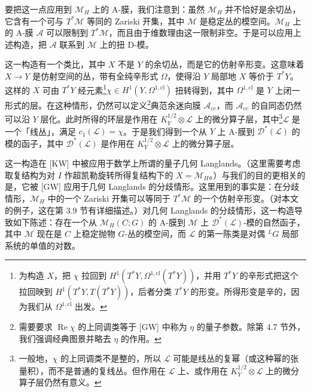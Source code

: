 \documentclass[11pt,a4paper]{article}
\begin{document}
要把这一点应用到 $\mathcal{M}_H$ 上的 A-膜，我们注意到：虽然 $\mathcal{M}_H$ 并不恰好是余切丛，它含有一个可与 $T^*\mathcal{M}$ 等同的 Zariski 开集，其中 $\mathcal{M}$ 是稳定丛的模空间。$\mathcal{M}_H$ 上的 A-膜 $\mathcal{A}$ 可以限制到 $T^*\mathcal{M}$，而且由于维数理由这一限制非空。于是可以应用上述构造，把 $\mathcal{A}$ 联系到 $\mathcal{M}$ 上的扭 D-模。

这一构造有一个类比，其中 $X$ 不是 $Y$ 的余切丛，而是它的仿射辛形变。这意味着 $X\to Y$ 是仿射空间的丛，带有全纯辛形式 $\Omega$，使得沿 $Y$ 局部地 $X$ 等价于 $T^*Y$。这样的 $X$ 可由 $T^*Y$ 经元素\footnote{为构造 $X$，把 $\chi$ 拉回到 $H^1(T^*Y,\Omega^{1,\mathrm{cl}}(T^*Y))$，并用 $T^*Y$ 的辛形式把这个拉回映到 $H^1(T^*Y,T(T^*Y))$，后者分类 $T^*Y$ 的形变。所得形变是辛的，因为我们从 $\Omega^{1,\mathrm{cl}}$ 出发。}$\chi\in H^1(Y,\Omega^{1,\mathrm{cl}})$ 扭转得到，其中 $\Omega^{1,\mathrm{cl}}$ 是 $Y$ 上闭一形式的层。在这种情形，仍然可以定义\footnote{需要要求 $\operatorname{Re}\chi$ 的上同调类等于 [GW] 中称为 $\eta$ 的量子参数。除第 4.7 节外，我们强调经典图景并略去 $\eta$ 的作用。}典范余迷向膜 $\mathcal{A}_{cc}$，而 $\mathcal{A}_{cc}$ 的自同态仍然可以沿 $Y$ 层化。此时所得的环层是作用在 $K_Y^{1/2}\otimes\mathcal{L}$ 上的微分算子层，其中\footnote{一般地，$\chi$ 的上同调类不是整的，所以 $\mathcal{L}$ 可能是线丛的复幂（或这种幂的张量积），而不是普通的复线丛。但作用在 $\mathcal{L}$ 上、或作用在 $K_Y^{1/2}\otimes\mathcal{L}$ 上的微分算子层仍然有意义。}$\mathcal{L}$ 是一个「线丛」，满足 $c_1(\mathcal{L})=\chi$。于是我们得到一个从 $Y$ 上 A-膜到 $\mathcal{D}^*(\mathcal{L})$ 的模的函子，其中 $\mathcal{D}^*(\mathcal{L})$ 是作用在 $K_Y^{1/2}\otimes\mathcal{L}$ 上的微分算子层。

这一构造在 [KW] 中被应用于数学上所谓的量子几何 Langlands。（这里需要考虑取复结构为对 $I$ 作超凯勒旋转所得复结构下的 $X=\mathcal{M}_H$。）与我们的目的更相关的是，它被 [GW] 应用于几何 Langlands 的分歧情形。这里用到的事实是：在分歧情形，$\mathcal{M}_H$ 中的一个 Zariski 开集可以等同于 $T^*\mathcal{M}$ 的一个仿射辛形变。（对本文的例子，这在第 3.9 节有详细描述。）对几何 Langlands 的分歧情形，这一构造导致如下陈述：存在一个从 $\mathcal{M}_H(C;G)$ 的 A-膜到 $\mathcal{M}$ 上 $\mathcal{D}^*(\mathcal{L})$-模的自然函子，其中 $\mathcal{M}$ 现在是 $C$ 上稳定抛物 $G$-丛的模空间，而 $\mathcal{L}$ 的第一陈类是对偶 ${}^{L}G$ 局部系统的单值的对数。
\end{document}
